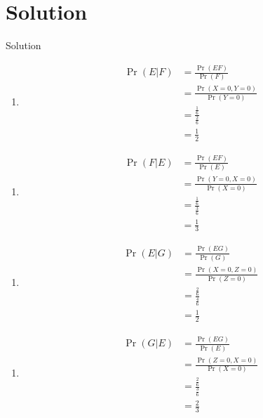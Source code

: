 \documentclass{beamer}
\providecommand{\pr}[1]{\ensuremath{\Pr\left(#1\right)}}
\newcounter{saveenumi}
\newcommand{\conti}{\setcounter{enumi}{\value{saveenumi}}}
\begin{document}
\section{Solution}
\begin{frame}{Solution}
	

\begin{enumerate}
\item 
\begin{align}
\pr{E|F}&=\frac{\pr{EF}}{\pr{F}}\\
&=\frac{\pr{X=0,Y=0}}{\pr{Y=0}}\\
&=\frac{\frac{1}{6}}{\frac{2}{6}}\\
&=\frac{1}{2}
\end{align}
\end{enumerate}
\end{frame}
	
\begin{frame}{}
\begin{enumerate}
\conti
\item 
\begin{align}
\pr{F|E}&=\frac{\pr{EF}}{\pr{E}}\\
&=\frac{\pr{Y=0,X=0}}{\pr{X=0}}\\
&=\frac{\frac{1}{6}}{\frac{3}{6}}\\
&=\frac{1}{3}
\end{align}
\end{enumerate}
\end{frame}
	
\begin{frame}{}
\begin{enumerate}
\item 
\begin{align}
\pr{E|G}&=\frac{\pr{EG}}{\pr{G}}\\
&=\frac{\pr{X=0,Z=0}}{\pr{Z=0}}\\
&=\frac{\frac{2}{6}}{\frac{4}{6}}\\
&=\frac{1}{2}
\end{align}
\end{enumerate}
	    
\end{frame}
\begin{frame}{}
\begin{enumerate}
\conti
\item 
\begin{align}
\pr{G|E}&=\frac{\pr{EG}}{\pr{E}}\\
&=\frac{\pr{Z=0,X=0}}{\pr{X=0}}\\
&=\frac{\frac{2}{6}}{\frac{3}{6}}\\
&=\frac{2}{3}
\end{align}
\end{enumerate}
\end{frame}
	
\end{document}
